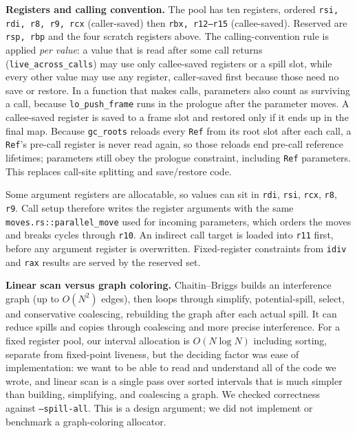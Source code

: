 \documentclass[10pt]{article}
\newcommand{\code}[1]{\texttt{\small #1}}
\begin{document}
\textbf{Registers and calling convention.} The pool has ten registers, ordered \code{rsi, rdi, r8, r9, rcx} (caller-saved) then \code{rbx, r12--r15} (callee-saved). Reserved are \code{rsp, rbp} and the four scratch registers above. The calling-convention rule is applied \emph{per value}: a value that is read after some call returns (\code{live\_across\_calls}) may use only callee-saved registers or a spill slot, while every other value may use any register, caller-saved first because those need no save or restore. In a function that makes calls, parameters also count as surviving a call, because \code{lo\_push\_frame} runs in the prologue after the parameter moves. A callee-saved register is saved to a frame slot and restored only if it ends up in the final map. Because \code{gc\_roots} reloads every \code{Ref} from its root slot after each call, a \code{Ref}'s pre-call register is never read again, so those reloads end pre-call reference lifetimes; parameters still obey the prologue constraint, including \code{Ref} parameters. This replaces call-site splitting and save/restore code.

Some argument registers are allocatable, so values can sit in \code{rdi}, \code{rsi}, \code{rcx}, \code{r8}, \code{r9}. Call setup therefore writes the register arguments with the same \code{moves.rs::parallel\_move} used for incoming parameters, which orders the moves and breaks cycles through \code{r10}. An indirect call target is loaded into \code{r11} first, before any argument register is overwritten. Fixed-register constraints from \code{idiv} and \code{rax} results are served by the reserved set.

\textbf{Linear scan versus graph coloring.} Chaitin--Briggs builds an interference graph (up to $O(N^2)$ edges), then loops through simplify, potential-spill, select, and conservative coalescing, rebuilding the graph after each actual spill. It can reduce spills and copies through coalescing and more precise interference. For a fixed register pool, our interval allocation is $O(N\log N)$ including sorting, separate from fixed-point liveness, but the deciding factor was ease of implementation: we want to be able to read and understand all of the code we wrote, and linear scan is a single pass over sorted intervals that is much simpler than building, simplifying, and coalescing a graph. We checked correctness against \code{--spill-all}. This is a design argument; we did not implement or benchmark a graph-coloring allocator.
\end{document}

